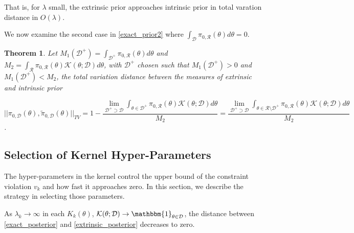 \documentclass[10pt]{article}
\newtheorem{theorem}{Theorem}
\newcommand{\mc}[1]{\mathcal{#1}}
\DeclareMathOperator{\1}{\mathbbm{1}}
\begin{document}
That is, for $\lambda$ small, the extrinsic prior approaches intrinsic prior in total varation distance in $O(\lambda)$.

We now examine the second case in \eqref{exact_prior2} where ${ \int_{\mc D} \pi_{0,\mc R}(\theta)d\theta }=0$.


\begin{theorem}
Let $M_1(\mc D^+)= \int_{\mc D^+} \pi_{0,\mc R}(\theta)d\theta$ and $M_2 = \int_{\mc R} \pi_{0,\mc R}(\theta) \mc K(\theta;\mc D)d\theta$, with $\mc D^+$ chosen such that $M_1(\mc D^+)>0$ and $M_1(\mc D^+)<M_2$, the total variation distance between the measures of extrinsic and intrinsic prior

$$||\pi_{0,\mc D}(\theta), \tilde{\pi}_{0,\mc D}(\theta) ||_{TV} = 1 - \frac{\lim_{\mc D^+\supset \mc D}\int_{\theta  \in \mc D^+} \pi_{0,\mc R}(\theta) \mc K(\theta;\mc D)d\theta}{M_2} = \frac{\lim_{\mc D^+\supset \mc D}\int_{\theta  \in \mc R \setminus \mc D^+} \pi_{0,\mc R}(\theta) \mc K(\theta;\mc D)d\theta}{M_2}$$.


\end{theorem}

\subsection{Selection of Kernel Hyper-Parameters}

The hyper-parameters in the kernel control the upper bound of the constraint violation $v_k$ and how fast it approaches zero. In this section, we describe the strategy in selecting those parameters.

As $\lambda_k\rightarrow \infty$ in each $K_k(\theta)$, $\mc{K}(\theta; \mc D)\rightarrow \mathbbm{1}_{\theta\in \mc D}$, the distance between \eqref{exact_posterior} and \eqref{extrinsic_posterior} decreases to zero.
\end{document}

